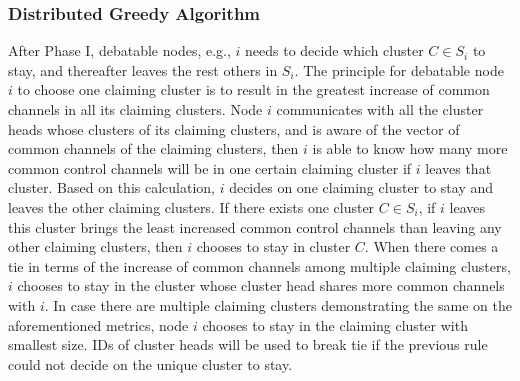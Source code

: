 \documentclass[10pt,journal,compsoc]{IEEEtran}
\makeatletter
\theoremstyle{mytheoremstyle}
\theoremstyle{mytheoremstyle}
\theoremstyle{mytheoremstyle}
\renewenvironment{proof}[1][\proofname]{%
      \par\pushQED{\qed}\fontfamily{ptm}\selectfont%
      \topsep6\p@\@plus6\p@\relax
      \trivlist\item[\hskip\labelsep\bfseries#1\@addpunct{.}]%
      \ignorespaces
    }{%
      \popQED\endtrivlist\@endpefalse
    }
\newcommand{\eg}{e.g., }
\makeatother
\begin{document}
%


\subsubsection{Distributed Greedy Algorithm}
After Phase I, debatable nodes, \eg $i$ needs to decide which cluster $C\in S_i$ to stay, and thereafter leaves the rest others in $S_i$.
The principle for debatable node $i$ to choose one claiming cluster is to result in the greatest increase of common channels in all its claiming clusters.
Node $i$ communicates with all the cluster heads whose clusters of its claiming clusters, and is aware of the vector of common channels of the claiming clusters, then $i$ is able to know how many more common control channels will be in one certain claiming cluster if $i$ leaves that cluster.
Based on this calculation, $i$ decides on one claiming cluster to stay and leaves the other claiming clusters.
If there exists one cluster $C\in S_i$, if $i$ leaves this cluster brings the least increased common control channels than leaving any other claiming clusters, then $i$ chooses to stay in cluster $C$.
When there comes a tie in terms of the increase of common channels among multiple claiming clusters, $i$ chooses to stay in the cluster whose cluster head shares more common channels with $i$.
In case there are multiple claiming clusters demonstrating the same on the aforementioned metrics, node $i$ chooses to stay in the claiming cluster with smallest size.
IDs of cluster heads will be used to break tie if the previous rule could not decide on the unique cluster to stay.
\end{document}
